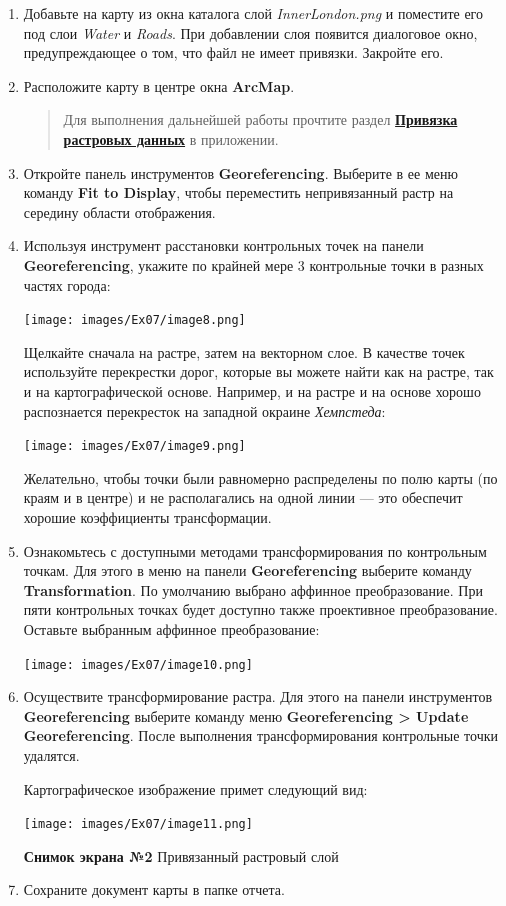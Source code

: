 \documentclass[12pt,]{book}
\begin{document}
\begin{enumerate}
\def\labelenumi{\arabic{enumi}.}
\item
  Добавьте на карту из окна каталога слой \emph{InnerLondon.png} и поместите его под слои \emph{Water} и \emph{Roads}. При добавлении слоя появится диалоговое окно, предупреждающее о том, что файл не имеет привязки. Закройте его.
\item
  Расположите карту в центре окна \textbf{ArcMap}.

  \begin{quote}
  Для выполнения дальнейшей работы прочтите раздел \textbf{\protect\hyperlink{manual-georef}{Привязка растровых данных}} в приложении.
  \end{quote}
\item
  Откройте панель инструментов \textbf{Georeferencing}. Выберите в ее меню команду \textbf{Fit to Display}, чтобы переместить непривязанный растр на середину области отображения.
\item
  Используя инструмент расстановки контрольных точек на панели \textbf{Georeferencing}, укажите по крайней мере 3 контрольные точки в разных частях города:

  \texttt{[image: images/Ex07/image8.png]}

  Щелкайте сначала на растре, затем на векторном слое. В качестве точек используйте перекрестки дорог, которые вы можете найти как на растре, так и на картографической основе. Например, и на растре и на основе хорошо распознается перекресток на западной окраине \emph{Хемпстеда}:

  \texttt{[image: images/Ex07/image9.png]}

  Желательно, чтобы точки были равномерно распределены по полю карты (по краям и в центре) и не располагались на одной линии --- это обеспечит хорошие коэффициенты трансформации.
\item
  Ознакомьтесь с доступными методами трансформирования по контрольным точкам. Для этого в меню на панели \textbf{Georeferencing} выберите команду \textbf{Transformation}. По умолчанию выбрано аффинное преобразование. При пяти контрольных точках будет доступно также проективное преобразование. Оставьте выбранным аффинное преобразование:

  \texttt{[image: images/Ex07/image10.png]}
\item
  Осуществите трансформирование растра. Для этого на панели инструментов \textbf{Georeferencing} выберите команду меню \textbf{Georeferencing \textgreater{} Update Georeferencing}. После выполнения трансформирования контрольные точки удалятся.

  Картографическое изображение примет следующий вид:

  \texttt{[image: images/Ex07/image11.png]}

  \textbf{Снимок экрана №2} Привязанный растровый слой
\item
  Сохраните документ карты в папке отчета.
\end{enumerate}
\end{document}
